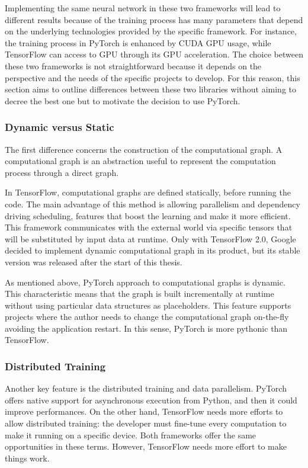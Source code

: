Implementing the same neural network in these two frameworks will lead to different results because of the training process has many parameters that depend on the underlying technologies provided by the specific framework. For instance, the training process in PyTorch is enhanced by CUDA GPU usage, while TensorFlow can access to GPU through its GPU acceleration.
The choice between these two frameworks is not straightforward because it depends on the perspective and the needs of the specific projects to develop.
For this reason, this section aims to outline differences between these two libraries without aiming to decree the best one but to motivate the decision to use PyTorch.

\subsubsection{Dynamic versus Static}

The first difference concerns the construction of the computational graph. A computational graph is an abstraction useful to represent the computation process through a direct graph.

In TensorFlow, computational graphs are defined statically, before running the code. The main advantage of this method is allowing parallelism and dependency driving scheduling, features that boost the learning and make it more efficient. This framework communicates with the external world via specific tensors that will be substituted by input data at runtime. 
Only with TensorFlow 2.0, Google decided to implement dynamic computational graph in its product, but its stable version was released after the start of this thesis.

As mentioned above, PyTorch approach to computational graphs is dynamic. This characteristic means that the graph is built incrementally at runtime without using particular data structures as placeholders. This feature supports projects where the author needs to change the computational graph on-the-fly avoiding the application restart. In this sense, PyTorch is more pythonic than TensorFlow.

\subsubsection{Distributed Training}

Another key feature is the distributed training and data parallelism. PyTorch offers native support for asynchronous execution from Python, and then it could improve performances. On the other hand, TensorFlow needs more efforts to allow distributed training: the developer must fine-tune every computation to make it running on a specific device. Both frameworks offer the same opportunities in these terms. However, TensorFlow needs more effort to make things work.

